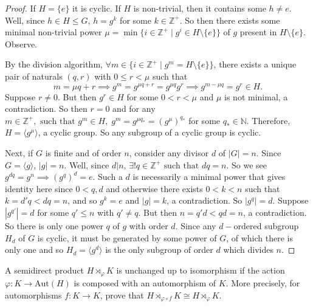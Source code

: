 \documentclass[addpoints,10pt]{exam}
\theoremstyle{plain}
\theoremstyle{definition}
\newtheorem{prob}[thm]{Problem}
\theoremstyle{plain}
\theoremstyle{plain}
\theoremstyle{definition}
\let\oldprob\prob
\let\endoldprob\endprob
\renewenvironment{prob}
  {\begin{singlespace}\oldprob}
  {\endoldprob\end{singlespace}}
\newcommand{\belowtitle}{\leavevmode\newline}
\newcommand{\NN}{\ensuremath{\mathbb{N}}}
\newcommand{\ZZ}{\ensuremath{\mathbb{Z}}}
\begin{document}
\begin{proof}
  If $H=\{e\}$ it is cyclic. If $H$ is non-trivial, then it contains some $h\neq e.$ Well, since $h\in H\leq G$, $h=g^{k}$ for some $k\in\ZZ^{+}$. So then there exists some minimal non-trivial power $\mu=\min \{i\in \ZZ^{+}\mid g^{i}\in H\setminus \{e\}\}$ of $g$ present in $H\setminus\{e\}$. Observe.

  By the division algorithm, $\forall m\in \{i\in \ZZ^{+}\mid g^{m}=H\setminus\{e\}\}$, there exists a unique pair of naturals $(q,r)$ with $0\leq r<\mu$ such that
  $$m=\mu q+r\implies g^{m}=g^{\mu q+r}=g^{\mu q}g^{r}\implies g^{m-\mu q}=g^{r}\in H.$$
  Suppose $r\neq 0$. But then $g^{r}\in H$ for some $0<r<\mu $ and $\mu $ is not minimal, a contradiction. So then $r=0$ and for any $m\in \ZZ^{+},\text{ such that }g^{m}\in H,\;g^{m}=g^{\mu q_{*}}=(g^{\mu })^{q_{*}}$ for some $q_{*}\in \NN$. Therefore, $H=\langle g^{\mu }\rangle$, a cyclic group. So any subgroup of a cyclic group is cyclic.

  Next, if $G$ is finite and of order $n$, consider any divisor $d$ of $|G|=n$. Since $G=\langle g\rangle$, $|g|=n$. Well, since $d|n,\,\exists!q\in \ZZ^{+}\text{ such that }dq=n$. So we see $g^{dq}=g^{n}\implies (g^{q})^{d}=e$. Such a $d$ is necessarily a minimal power that gives identity here since $0<q,d$ and otherwise there exists $0<k<n$ such that $k=d'q<dq=n$, and so $g^{k}=e$ and $|g|=k$, a contradiction. So $|g^{q}|=d.$ Suppose $|g^{q'}|=d$ for some $q'\leq n$ with $q'\neq q$. But then $n=q'd< qd=n$, a contradiction. So there is only one power $q$ of $g$ with order $d$. Since any $d-$ordered subgroup $H_{d}$ of $G$ is cyclic, it must be generated by some power of $G$, of which there is only one and so $H_{d}=\langle g^{d}\rangle$ is the only subgroup of order $d$ which divides $n$.

\end{proof}
\newpage
\begin{prob}\belowtitle A semidirect product $H\rtimes_{\varphi} K$ is unchanged up to isomorphism if the action $\varphi:K\to \mathrm{Aut}(H)$ is composed with an automorphism of $K$. More precisely, for automorphisms $f:K\to K$, prove that
$H\rtimes_{\varphi\circ f} K \cong H\rtimes_{\varphi} K$.\end{prob}
\end{document}
